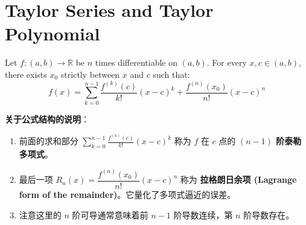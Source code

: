\documentclass[
	UTF-8,
	11pt, %
	a4paper, %
]{LegrandOrangeBook}
\begin{document}
    \newpage

    \section{Taylor Series and Taylor Polynomial}

        
    \begin{theorem}
    Let $f: (a, b) \to \mathbb{R}$ be $n$ times differentiable on $(a, b)$. 
    For every $x, c \in (a, b)$, there exists $x_0$ strictly between $x$ and $c$ such that:
    \[ f(x) = \sum_{k=0}^{n-1} \frac{f^{(k)}(c)}{k!} (x - c)^k + \frac{f^{(n)}(x_0)}{n!} (x - c)^n \]
    \end{theorem}

    \begin{remark}
    \textbf{关于公式结构的说明}：
    \begin{enumerate}
        \item 前面的求和部分 $\displaystyle\sum_{k=0}^{n-1} \frac{f^{(k)}(c)}{k!} (x - c)^k$ 
        称为 $f$ 在 $c$ 点的 \textbf{$(n-1)$ 阶泰勒多项式}。

        \item 最后一项 $R_n(x) = \dfrac{f^{(n)}(x_0)}{n!} (x - c)^n$ 
        称为 \textbf{拉格朗日余项 (Lagrange form of the remainder)}。它量化了多项式逼近的误差。
        
        \item 注意这里的 $n$ 阶可导通常意味着前 $n-1$ 阶导数连续，第 $n$ 阶导数存在。
    \end{enumerate}
    \end{remark}
\end{document}
